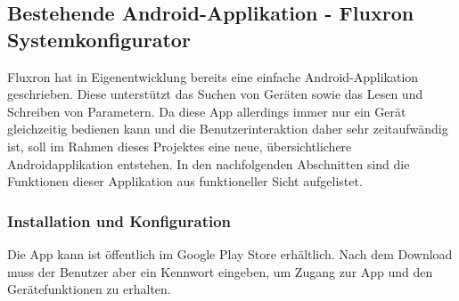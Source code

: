 \subsection{Bestehende Android-Applikation - Fluxron Systemkonfigurator }
\label{subsec:Bestehende Smartphone-Applikation}
Fluxron hat in Eigenentwicklung bereits eine einfache Android-Applikation geschrieben. Diese unterstützt das Suchen von Geräten sowie das Lesen und Schreiben von Parametern. Da diese App allerdings immer nur ein Gerät gleichzeitig bedienen kann und die Benutzerinteraktion daher sehr zeitaufwändig ist, soll im Rahmen dieses Projektes eine neue, übersichtlichere Androidapplikation entstehen. In den nachfolgenden Abschnitten sind die Funktionen dieser Applikation aus funktioneller Sicht aufgelistet.

\subsubsection{Installation und Konfiguration}
\label{subsubsec:Installation und Konfiguration}
Die App kann ist öffentlich im Google Play Store erhältlich. Nach dem Download muss der Benutzer aber ein Kennwort eingeben, um Zugang zur App und den Gerätefunktionen zu erhalten.

